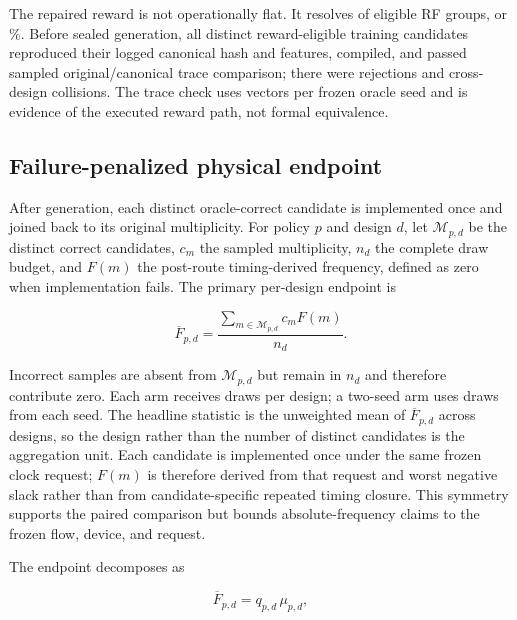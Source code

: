 The repaired reward is not operationally flat.  It resolves
 of
 eligible RF groups, or
\%.  Before sealed generation, all
 distinct reward-eligible training
candidates reproduced their logged canonical hash and features, compiled, and
passed sampled original/canonical trace comparison; there were
 rejections and
 cross-design collisions.  The trace
check uses  vectors per frozen oracle
seed and is evidence of the executed reward path, not formal equivalence.

\subsection{Failure-penalized physical endpoint}

After generation, each distinct oracle-correct candidate is implemented once
and joined back to its original multiplicity.  For policy $p$ and design $d$,
let $\mathcal{M}_{p,d}$ be the distinct correct candidates, $c_m$ the sampled
multiplicity, $n_d$ the complete draw budget, and $F(m)$ the post-route
timing-derived frequency, defined as zero when implementation fails.  The
primary per-design endpoint is

\begin{equation}
\overline{F}_{p,d}=\frac{\sum_{m\in\mathcal{M}_{p,d}}c_mF(m)}{n_d}.
\label{eq:equal-sample}
\end{equation}

Incorrect samples are absent from $\mathcal{M}_{p,d}$ but remain in $n_d$ and
therefore contribute zero.  Each arm receives
 draws per design; a two-seed arm uses
 draws from each seed.  The headline
statistic is the unweighted mean of $\overline{F}_{p,d}$ across designs, so the
design rather than the number of distinct candidates is the aggregation unit.
Each candidate is implemented once under the same frozen clock request; $F(m)$
is therefore derived from that request and worst negative slack rather than
from candidate-specific repeated timing closure.  This symmetry supports the
paired comparison but bounds absolute-frequency claims to the frozen flow,
device, and request.

The endpoint decomposes as

\begin{equation}
\overline{F}_{p,d}=q_{p,d}\,\mu_{p,d},
\label{eq:decomposition}
\end{equation}

